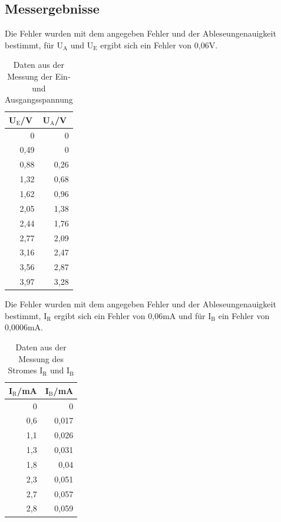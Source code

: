 \documentclass[12pt,a4paper]{article}
\begin{document}
\subsection{Messergebnisse}

Die Fehler wurden mit dem angegeben Fehler und der Ableseungenauigkeit bestimmt, für U$_\text{A}$ und U$_\text{E}$ ergibt sich ein Fehler von 0,06V.

\begin{table}[H]
\caption{Daten aus der Messung der Ein- und Ausgangsspannung}
\begin{center}
\begin{tabular}{|r|r|}
\hline
\multicolumn{1}{|l|}{U$_\text{E}$/V} & \multicolumn{1}{l|}{U$_\text{A}$/V} \\ \hline
0 & 0 \\ \hline
0,49 & 0 \\ \hline
0,88 & 0,26 \\ \hline
1,32 & 0,68 \\ \hline
1,62 & 0,96 \\ \hline
2,05 & 1,38 \\ \hline
2,44 & 1,76 \\ \hline
2,77 & 2,09 \\ \hline
3,16 & 2,47 \\ \hline
3,56 & 2,87 \\ \hline
3,97 & 3,28 \\ \hline
\end{tabular}
\end{center}
\label{tab:a_3_u}
\end{table}

Die Fehler wurden mit dem angegeben Fehler und der Ableseungenauigkeit bestimmt, I$_\text{R}$ ergibt sich ein Fehler von 0,06mA und für I$_\text{B}$ ein Fehler von 0,0006mA.


\begin{table}[H]
\caption{Daten aus der Messung des Stromes I$_\text{R}$ und I$_\text{B}$}
\begin{center}
\begin{tabular}{|r|r|}
\hline
\multicolumn{1}{|l|}{I$_\text{R}$/mA} & \multicolumn{1}{l|}{I$_\text{B}$/mA} \\ \hline
0 & 0 \\ \hline
0,6 & 0,017 \\ \hline
1,1 & 0,026 \\ \hline
1,3 & 0,031 \\ \hline
1,8 & 0,04 \\ \hline
2,3 & 0,051 \\ \hline
2,7 & 0,057 \\ \hline
2,8 & 0,059 \\ \hline
\end{tabular}
\end{center}
\label{tab:a_3_i}
\end{table}
\end{document}
